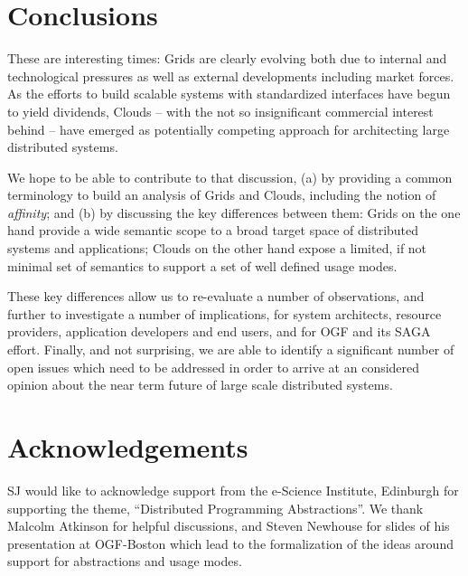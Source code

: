 \documentclass[conference,final]{IEEEtran}
\newcommand{\I}[1]{\textit{#1}}
\begin{document}
\section{Conclusions}

 These are interesting times: Grids are clearly evolving both due to
 internal and technological pressures as well as external developments
 including market forces.  As the efforts to build scalable systems
 with standardized interfaces have begun to yield dividends, Clouds --
 with the not so insignificant commercial interest behind -- have
 emerged as potentially competing approach for architecting large
 distributed systems.
 

 We hope to be able to contribute to that discussion, (a) by providing
 a common terminology to build an analysis of Grids and Clouds,
 including the notion of \I{affinity}; and (b) by discussing the key
 differences between them: Grids on the one hand provide a wide
 semantic scope to a broad target space of distributed systems and
 applications; Clouds on the other hand expose a limited, if not
 minimal set of semantics to support a set of well defined usage
 modes.

 These key differences allow us to re-evaluate a number of
 observations, and further to investigate a number of implications,
 for system architects, resource providers, application developers and
 end users, and for OGF and its SAGA effort.  Finally, and not
 surprising, we are able to identify a significant number of open
 issues which need to be addressed in order to arrive at an considered
 opinion about the near term future of large scale distributed
 systems.


\section{Acknowledgements}

 SJ would like to acknowledge support from the e-Science Institute,
 Edinburgh for supporting the theme, ``Distributed Programming
 Abstractions''.  We thank Malcolm Atkinson for helpful discussions,
 and Steven Newhouse for slides of his presentation at OGF-Boston
 which lead to the formalization of the ideas around support for
 abstractions and usage modes.

 
 
\end{document}
